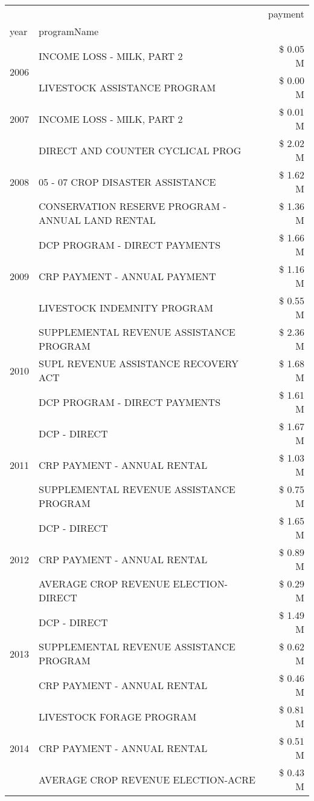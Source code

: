 \begin{tabular}{llr}
\toprule
 &  & payment \\
year & programName &  \\
\midrule
\multirow[t]{2}{*}{2006} & INCOME LOSS - MILK, PART 2 & \$ 0.05 M \\
 & LIVESTOCK ASSISTANCE PROGRAM & \$ 0.00 M \\
\cline{1-3}
2007 & INCOME LOSS - MILK, PART 2 & \$ 0.01 M \\
\cline{1-3}
\multirow[t]{3}{*}{2008} & DIRECT AND COUNTER CYCLICAL PROG & \$ 2.02 M \\
 & 05 - 07 CROP DISASTER ASSISTANCE & \$ 1.62 M \\
 & CONSERVATION RESERVE PROGRAM - ANNUAL LAND RENTAL & \$ 1.36 M \\
\cline{1-3}
\multirow[t]{3}{*}{2009} & DCP PROGRAM - DIRECT PAYMENTS & \$ 1.66 M \\
 & CRP PAYMENT - ANNUAL PAYMENT & \$ 1.16 M \\
 & LIVESTOCK INDEMNITY PROGRAM & \$ 0.55 M \\
\cline{1-3}
\multirow[t]{3}{*}{2010} & SUPPLEMENTAL REVENUE ASSISTANCE PROGRAM & \$ 2.36 M \\
 & SUPL REVENUE ASSISTANCE RECOVERY ACT & \$ 1.68 M \\
 & DCP PROGRAM - DIRECT PAYMENTS & \$ 1.61 M \\
\cline{1-3}
\multirow[t]{3}{*}{2011} & DCP - DIRECT & \$ 1.67 M \\
 & CRP PAYMENT - ANNUAL RENTAL & \$ 1.03 M \\
 & SUPPLEMENTAL REVENUE ASSISTANCE PROGRAM & \$ 0.75 M \\
\cline{1-3}
\multirow[t]{3}{*}{2012} & DCP - DIRECT & \$ 1.65 M \\
 & CRP PAYMENT - ANNUAL RENTAL & \$ 0.89 M \\
 & AVERAGE CROP REVENUE ELECTION-DIRECT & \$ 0.29 M \\
\cline{1-3}
\multirow[t]{3}{*}{2013} & DCP - DIRECT & \$ 1.49 M \\
 & SUPPLEMENTAL REVENUE ASSISTANCE PROGRAM & \$ 0.62 M \\
 & CRP PAYMENT - ANNUAL RENTAL & \$ 0.46 M \\
\cline{1-3}
\multirow[t]{3}{*}{2014} & LIVESTOCK FORAGE PROGRAM & \$ 0.81 M \\
 & CRP PAYMENT - ANNUAL RENTAL & \$ 0.51 M \\
 & AVERAGE CROP REVENUE ELECTION-ACRE & \$ 0.43 M \\

\end{tabular}
